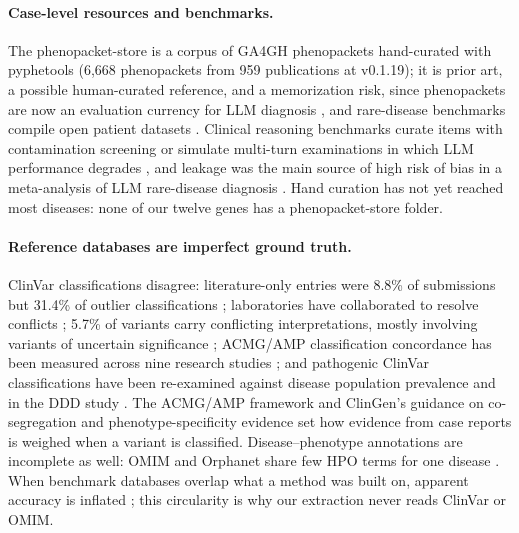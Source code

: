 \documentclass{article} %
\begin{document}
\paragraph{Case-level resources and benchmarks.} The phenopacket-store \citep{danis2025_phenopacket_store} is a corpus of GA4GH phenopackets hand-curated with pyphetools (6,668 phenopackets from 959 publications at v0.1.19); it is prior art, a possible human-curated reference, and a memorization risk, since phenopackets are now an evaluation currency for LLM diagnosis \citep{reese2026_llm_vs_exomiser}, and rare-disease benchmarks compile open patient datasets \citep{Chen2024RarebenchCan}. Clinical reasoning benchmarks curate items with contamination screening \citep{Shao2025MedicalagentsbenchComplex} or simulate multi-turn examinations in which LLM performance degrades \citep{Chiu2025SimulatingViva}, and leakage was the main source of high risk of bias in a meta-analysis of LLM rare-disease diagnosis \citep{nguyen2026_llm_rd_metaanalysis}. Hand curation has not yet reached most diseases: none of our twelve genes has a phenopacket-store folder.

\paragraph{Reference databases are imperfect ground truth.} ClinVar classifications disagree: literature-only entries were 8.8\% of submissions but 31.4\% of outlier classifications \citep{yang2017_clinvar_discordance}; laboratories have collaborated to resolve conflicts \citep{harrison2017_clinvar_conflicts}; 5.7\% of variants carry conflicting interpretations, mostly involving variants of uncertain significance \citep{Lazareva2024MajorCauses}; ACMG/AMP classification concordance has been measured across nine research studies \citep{Amendola2020VariantClassification}; and pathogenic ClinVar classifications have been re-examined against disease population prevalence \citep{Shah2018IdentificationMisclassified} and in the DDD study \citep{wright2021_ddd_clinvar}. The ACMG/AMP framework \citep{richards2015_acmg} and ClinGen's guidance on co-segregation and phenotype-specificity evidence \citep{biesecker2024_clingen_pp1_pp4} set how evidence from case reports is weighed when a variant is classified. Disease--phenotype annotations are incomplete as well: OMIM and Orphanet share few HPO terms for one disease \citep{connelly2026_fanconi_annotations}. When benchmark databases overlap what a method was built on, apparent accuracy is inflated \citep{Grimm2015EvaluationTools}; this circularity is why our extraction never reads ClinVar or OMIM.
\end{document}
